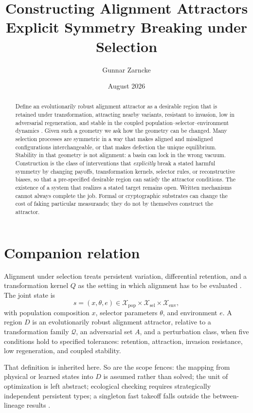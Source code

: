 \documentclass[11pt]{article}
\title{\textbf{Constructing Alignment Attractors}\\
\large Explicit Symmetry Breaking under Selection}
\author{Gunnar Zarncke}
\date{August 2026}
\newcommand{\Q}{\mathcal{Q}}
\newcommand{\X}{\mathcal{X}}
\begin{document}
\maketitle

\begin{abstract}
Define an evolutionarily robust alignment attractor as a desirable region that is retained under transformation, attracting nearby variants, resistant to invasion, low in adversarial regeneration, and stable in the coupled population--selector--environment dynamics \parencite{zarncke2026selection}. 
Given such a geometry we ask how the geometry can be changed.
Many selection processes are symmetric in a way that makes aligned and misaligned configurations interchangeable, or that makes defection the unique equilibrium. Stability in that geometry is not alignment: a basin can lock in the wrong vacuum. Construction is the class of interventions that \emph{explicitly} break a stated harmful symmetry by changing payoffs, transformation kernels, selector rules, or reconstructive biases, so that a pre-specified desirable region can satisfy the attractor conditions. The existence of a system that realizes a stated target remains open. Written mechanisms cannot always complete the job. Formal or cryptographic substrates can change the cost of faking particular measurands; they do not by themselves construct the attractor.
\end{abstract}

\section{Companion relation}

Alignment under selection treats persistent variation, differential retention, and a transformation kernel \(Q\) as the setting in which alignment has to be evaluated \parencite{zarncke2026selection}. The joint state is
\begin{equation}
    s=(x,\theta,e)\in\X_{\mathrm{pop}}\times\X_{\mathrm{sel}}\times\X_{\mathrm{env}},
\end{equation}
with population composition \(x\), selector parameters \(\theta\), and environment \(e\). A region \(D\) is an evolutionarily robust alignment attractor, relative to a transformation family \(\Q\), an adversarial set \(A\), and a perturbation class, when five conditions hold to specified tolerances: retention, attraction, invasion resistance, low regeneration, and coupled stability.

That definition is inherited here. So are the scope fences: the mapping from physical or learned states into \(D\) is assumed rather than solved; the unit of optimization is left abstract; ecological checking requires strategically independent persistent types; a singleton fast takeoff falls outside the between-lineage results \parencite{bostrom2014,yudkowsky2022,kulveit2025pando}.
\end{document}
